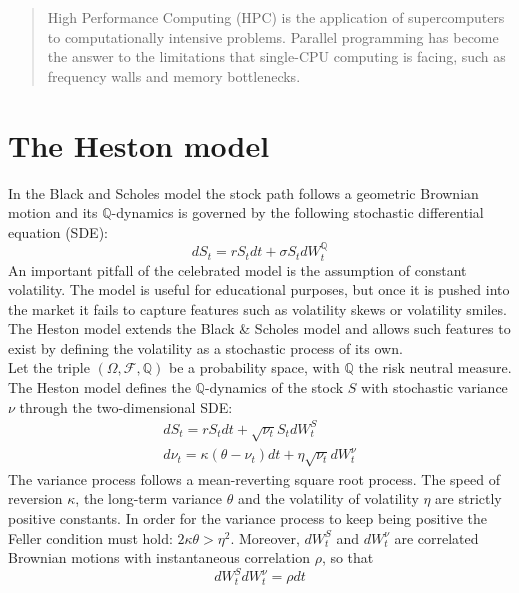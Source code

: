 \documentclass[12pt]{article}
\numberwithin{equation}{section}
\begin{document}
\maketitle
\pagestyle{plain}
\tableofcontents
\newpage
\clearpage
{}

\begin{abstract}
High Performance Computing (HPC) is the application of supercomputers to computationally intensive problems. Parallel programming has become the answer to the limitations that single-CPU computing is facing, such as frequency walls and memory bottlenecks. \\
\end{abstract}

\section{The Heston model}
In the Black and Scholes model the stock path follows a geometric Brownian motion and its $\mathbb{Q}$-dynamics is governed by the following stochastic differential equation (SDE):
\begin{equation*}
dS_t = rS_tdt + \sigma S_tdW_t^\mathbb{Q}
\end{equation*}
An important pitfall of the celebrated model is the assumption of constant volatility. The model is useful for educational purposes, but once it is pushed into the market it fails to capture features such as volatility skews or volatility smiles. The Heston model extends the Black \& Scholes model and allows such features to exist by defining the volatility as a stochastic process of its own.\\
\newline
Let the triple $(\Omega,\mathscr{F},\mathbb{Q})$ be a probability space, with $\mathbb{Q}$ the risk neutral measure. The Heston model defines the $\mathbb{Q}$-dynamics of the stock $S$ with stochastic variance $\nu$ through the two-dimensional SDE:
\begin{align}\label{HestonStock}
dS_t = rS_tdt + \sqrt{\nu_t}S_tdW_t^S \\
d\nu_t = \kappa(\theta - \nu_t)dt + \eta\sqrt{\nu_t}dW_t^\nu
\end{align}
The variance process follows a mean-reverting square root process. The speed of reversion $\kappa$, the long-term variance $\theta$ and the volatility of volatility $\eta$ are strictly positive constants. In order for the variance process to keep being positive the Feller condition must hold: $2\kappa\theta > \eta^2$. Moreover, $dW_t^S$ and $dW_t^\nu$ are correlated Brownian motions with instantaneous correlation $\rho$, so that
\begin{equation*}
dW_t^S dW_t^\nu = \rho dt
\end{equation*}
\end{document}
